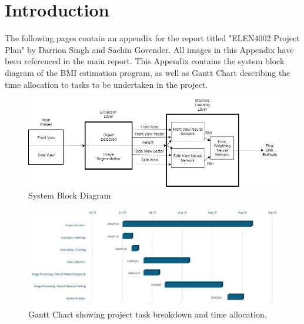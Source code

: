 \documentclass[conference]{IEEEtran}
\begin{document}
\section{Introduction}
The following pages contain an appendix for the report titled "ELEN4002 Project Plan" by Darrion Singh and Sachin Govender.
All images in this Appendix have been referenced in the main report.
This Appendix contains the system block diagram of the BMI estimation program, as well as Gantt Chart describing the time allocation to tasks to be undertaken in the project.
\begin{landscape}
\begin{figure}
    \centering
    \includegraphics[width=\linewidth]{systemblock.jpg}
    \caption{System Block Diagram}
    \label{fig:systemblockdiagram}
\end{figure}
\end{landscape}
\begin{landscape}
\begin{figure}
    \centering
    \includegraphics[width=\linewidth]{gannt.JPG}
    \caption{Gantt Chart showing project task breakdown and time allocation.}
    \label{fig:gantt}
\end{figure}
\end{landscape}
\end{document}
